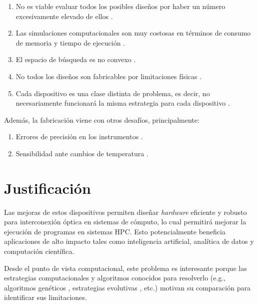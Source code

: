 \begin{enumerate}
  \item No es viable evaluar todos los posibles diseños por haber un número excesivamente elevado de ellos \citep{Vuckovic2019}.
  \item Las simulaciones computacionales son muy costosas en términos de consumo de memoria y 
    tiempo de ejecución \citep{Kudyshev2020}.
  \item El espacio de búsqueda es no convexo \citep{Su2018}.
  \item No todos los diseños son fabricables por limitaciones físicas \citep{Su2020}.
  \item Cada dispositivo es una clase distinta de problema, es decir, no necesariamente funcionará la misma estrategia para cada dispositivo \citep{Molesky2018}.
\end{enumerate}

Además, la fabricación viene con otros desafíos, principalmente:

\begin{enumerate}
  \item Errores de precisión en los instrumentos \citep{Piggott2017}.
  \item Sensibilidad ante cambios de temperatura \citep{Vuckovic2019}.
\end{enumerate}


\section{Justificación}


Las mejoras de estos dispositivos permiten diseñar \emph{hardware} eficiente y robusto para interconexión
óptica en sistemas de cómputo, lo cual permitirá mejorar la ejecución de programas en sistemas HPC. Esto
potencialmente beneficia aplicaciones de alto impacto \citep{Shen2019} tales como inteligencia artificial, analítica de datos y computación científica.

Desde el punto de vista computacional, 
este problema es interesante porque las estrategias computacionales y algoritmos conocidos para resolverlo
(e.g., algoritmos genéticos \citep{Mykel2019}, estrategias evolutivas \citep{Hansen2016}, etc.) motivan su
comparación para identificar sus limitaciones.


